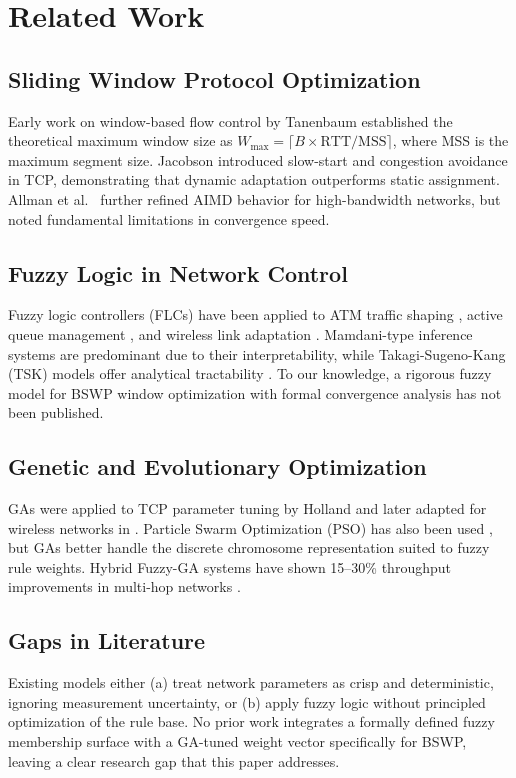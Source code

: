 \documentclass[10pt, twocolumn]{IEEEtran}
\theoremstyle{definition}
\begin{document}
\section{Related Work}
\label{sec:related}

\subsection{Sliding Window Protocol Optimization}
Early work on window-based flow control by Tanenbaum \cite{tanenbaum2011computer} established the theoretical maximum window size as $W_{\max} = \lceil B \times \text{RTT} / \text{MSS} \rceil$, where MSS is the maximum segment size. Jacobson \cite{jacobson1988congestion} introduced slow-start and congestion avoidance in TCP, demonstrating that dynamic adaptation outperforms static assignment. Allman et al.\ \cite{allman1999tcp} further refined AIMD behavior for high-bandwidth networks, but noted fundamental limitations in convergence speed.

\subsection{Fuzzy Logic in Network Control}
Fuzzy logic controllers (FLCs) have been applied to ATM traffic shaping \cite{Jamshidi1997}, active queue management \cite{floyd1993random}, and wireless link adaptation \cite{chen2018fuzzy}. Mamdani-type inference systems are predominant due to their interpretability, while Takagi-Sugeno-Kang (TSK) models offer analytical tractability \cite{takagi1985fuzzy}. To our knowledge, a rigorous fuzzy model for BSWP window optimization with formal convergence analysis has not been published.

\subsection{Genetic and Evolutionary Optimization}
GAs were applied to TCP parameter tuning by Holland \cite{goldberg1989genetic} and later adapted for wireless networks in \cite{kumar2020adaptive}. Particle Swarm Optimization (PSO) has also been used \cite{kennedy1995particle}, but GAs better handle the discrete chromosome representation suited to fuzzy rule weights. Hybrid Fuzzy-GA systems have shown 15--30\% throughput improvements in multi-hop networks \cite{chen2018fuzzy}.

\subsection{Gaps in Literature}
Existing models either (a) treat network parameters as crisp and deterministic, ignoring measurement uncertainty, or (b) apply fuzzy logic without principled optimization of the rule base. No prior work integrates a formally defined fuzzy membership surface with a GA-tuned weight vector specifically for BSWP, leaving a clear research gap that this paper addresses.
\end{document}
